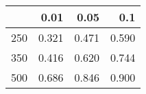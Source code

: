 % 
\begin{tabular}{rrrr}
  \hline
 & 0.01 & 0.05 & 0.1 \\ 
  \hline
250 & 0.321 & 0.471 & 0.590 \\ 
  350 & 0.416 & 0.620 & 0.744 \\ 
  500 & 0.686 & 0.846 & 0.900 \\ 
   \hline
\end{tabular}

